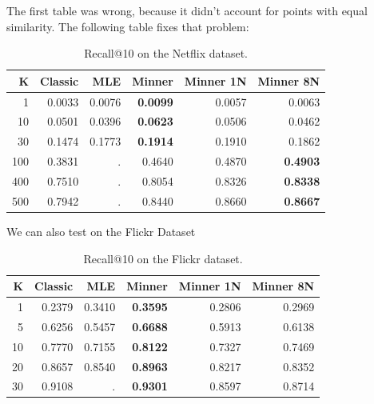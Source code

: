 %

The first table was wrong, because it didn't account for points with equal similarity.
The following table fixes that problem:
\begin{table}[h!]
\centering
 \begin{tabular}{|r| r r r r r|} 
 \hline
 K  & Classic & MLE & Minner & Minner 1N & Minner 8N \\
 \hline
    1 & 0.0033 & 0.0076 & \textbf{ 0.0099} & 0.0057 & 0.0063 \\
  10 & 0.0501 & 0.0396 & \textbf{ 0.0623} & 0.0506 & 0.0462 \\
  30 & 0.1474 & 0.1773 & \textbf{ 0.1914} & 0.1910 & 0.1862 \\
 100 & 0.3831 &      . & 0.4640 & 0.4870 & \textbf{ 0.4903} \\
 400 & 0.7510 &      . & 0.8054 & 0.8326 & \textbf{ 0.8338} \\
 500 & 0.7942 &      . & 0.8440 & 0.8660 & \textbf{ 0.8667} \\
  \hline
 \end{tabular}
 \caption{Recall@10 on the Netflix dataset.}
 \label{tab:netflix}
\end{table}

We can also test on the Flickr Dataset
\begin{table}[h!]
\centering
 \begin{tabular}{|r| r r r r r|} 
 \hline
 K  & Classic & MLE & Minner & Minner 1N & Minner 8N \\
 \hline
    1 & 0.2379 & 0.3410 & \textbf{ 0.3595} & 0.2806 & 0.2969 \\
   5 & 0.6256 & 0.5457 & \textbf{ 0.6688} & 0.5913 & 0.6138 \\
  10 & 0.7770 & 0.7155 & \textbf{ 0.8122} & 0.7327 & 0.7469 \\
  20 & 0.8657 & 0.8540 & \textbf{ 0.8963} & 0.8217 & 0.8352 \\
  30 & 0.9108 &      . & \textbf{ 0.9301} & 0.8597 & 0.8714 \\
  \hline
 \end{tabular}
 \caption{Recall@10 on the Flickr dataset.}
 \label{tab:flickr}
\end{table}

